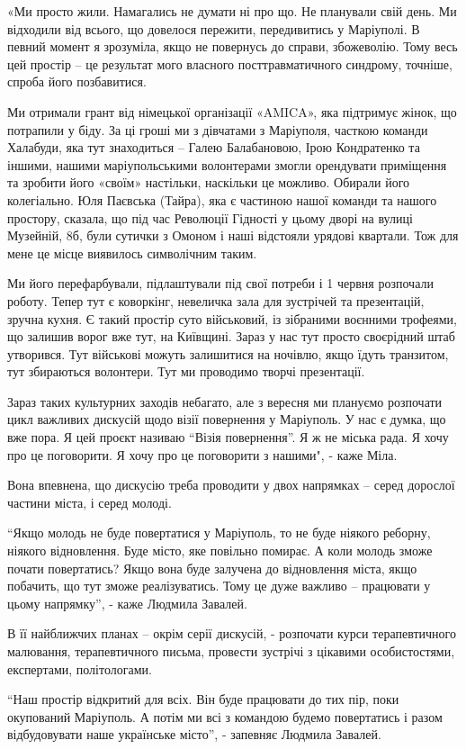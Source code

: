 «Ми просто жили. Намагались не думати ні про що. Не планували свій день. Ми
відходили від всього, що довелося пережити, передивитись у Маріуполі. В певний
момент я зрозуміла, якщо не повернусь до справи, збожеволію. Тому весь цей
простір – це результат мого власного посттравматичного синдрому, точніше,
спроба його позбавитися.

Ми отримали грант від німецької організації «AMICA», яка підтримує жінок, що
потрапили у біду. За ці гроші ми з дівчатами з Маріуполя, часткою команди
Халабуди, яка тут знаходиться – Галею Балабановою, Ірою Кондратенко та іншими,
нашими маріупольськими волонтерами змогли орендувати приміщення та зробити його
«своїм» настільки, наскільки це можливо. Обирали його колегіально. Юля Паєвська
(Тайра), яка є частиною нашої команди та нашого простору, сказала, що під час
Революції Гідності у цьому дворі на вулиці Музейній, 8б,  були сутички з Омоном
і наші відстояли урядові квартали. Тож для мене це місце виявилось символічним
таким.

Ми його перефарбували, підлаштували під свої потреби і 1 червня розпочали
роботу. Тепер тут є коворкінг, невеличка зала для зустрічей та презентацій,
зручна кухня. Є такий простір суто військовий, із зібраними воєнними трофеями,
що залишив ворог вже тут, на Київщині. Зараз у нас тут просто своєрідний штаб
утворився. Тут військові можуть залишитися на ночівлю, якщо їдуть транзитом,
тут збираються волонтери. Тут ми проводимо творчі презентації.

Зараз таких культурних заходів небагато, але з вересня ми плануємо розпочати
цикл важливих дискусій щодо візії повернення у Маріуполь. У нас є думка, що вже
пора. Я цей проєкт називаю \enquote{Візія повернення}. Я ж не міська рада. Я хочу про
це поговорити. Я хочу про це поговорити з нашими", - каже Міла.

Вона впевнена, що дискусію треба проводити у двох напрямках – серед дорослої
частини міста, і серед молоді.

\enquote{Якщо молодь не буде повертатися у Маріуполь, то не буде ніякого реборну,
ніякого відновлення. Буде місто, яке повільно помирає. А коли молодь зможе
почати повертатись? Якщо вона буде залучена до відновлення міста, якщо
побачить, що тут зможе реалізуватись. Тому це дуже важливо – працювати у цьому
напрямку}, - каже Людмила Завалей.

В її найближчих планах – окрім серії дискусій,  - розпочати курси
терапевтичного малювання, терапевтичного письма, провести зустрічі з цікавими
особистостями, експертами, політологами.

\enquote{Наш простір відкритий для всіх. Він буде працювати до тих пір, поки окупований
Маріуполь. А потім ми всі з командою будемо повертатись і разом відбудовувати
наше українське місто}, - запевняє Людмила Завалей.
